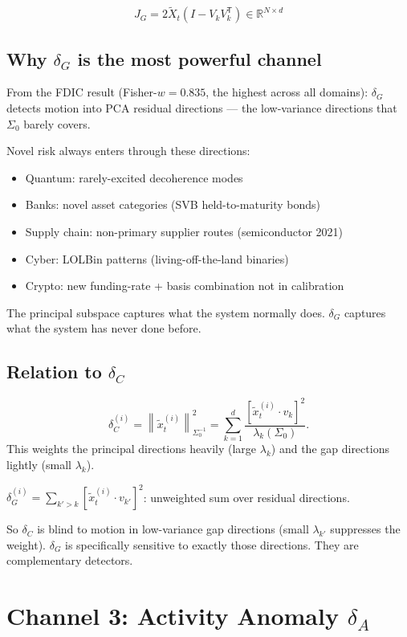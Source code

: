 \documentclass[11pt,a4paper]{article}
\theoremstyle{definition}
\newcommand{\R}{\mathbb{R}}
\newcommand{\T}{^{\mathsf{T}}}
\newcommand{\norm}[1]{\left\|#1\right\|}
\begin{document}
\[
J_G = 2\tilde X_t(I - V_kV_k\T) \in \R^{N\times d}
\]

\subsection{Why $\delta_G$ is the most powerful channel}

From the FDIC result (Fisher-$w = 0.835$, the highest across all domains):
$\delta_G$ detects motion into PCA residual directions — the low-variance directions
that $\Sigma_0$ barely covers.

Novel risk always enters through these directions:
\begin{itemize}
\item Quantum: rarely-excited decoherence modes
\item Banks: novel asset categories (SVB held-to-maturity bonds)
\item Supply chain: non-primary supplier routes (semiconductor 2021)
\item Cyber: LOLBin patterns (living-off-the-land binaries)
\item Crypto: new funding-rate + basis combination not in calibration
\end{itemize}

The principal subspace captures what the system normally does.
$\delta_G$ captures what the system has never done before.

\subsection{Relation to $\delta_C$}

\[
\delta_C^{(i)} = \norm{\tilde x_t^{(i)}}_{\Sigma_0^{-1}}^2 = \sum_{k=1}^d \frac{[\tilde x_t^{(i)}\cdot v_k]^2}{\lambda_k(\Sigma_0)}.
\]
This weights the principal directions heavily (large $\lambda_k$) and the gap directions lightly (small $\lambda_k$).

$\delta_G^{(i)} = \sum_{k'>k}[\tilde x_t^{(i)}\cdot v_{k'}]^2$: unweighted sum over residual directions.

So $\delta_C$ is blind to motion in low-variance gap directions (small $\lambda_{k'}$ suppresses the weight).
$\delta_G$ is specifically sensitive to exactly those directions.
They are complementary detectors.

\section{Channel 3: Activity Anomaly $\delta_A$}
\end{document}
